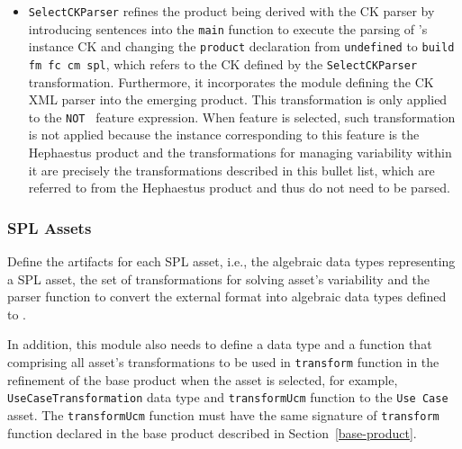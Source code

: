 \begin{itemize}
\item \texttt{SelectCKParser} refines the product being derived with the CK parser by introducing sentences into the \texttt{main} function to execute the parsing of \hpl's instance CK and changing the \texttt{product} declaration from \texttt{undefined} to \texttt{build fm fc cm spl}, which refers to the CK defined by the \texttt{SelectCKParser} transformation. Furthermore, it incorporates the module defining the CK XML parser into the emerging product. This transformation is only applied to the \texttt{NOT \hp{}} feature expression. When \texttt{\hp{}} feature is selected, such transformation is not applied because the instance corresponding to this feature is the Hephaestus product and the transformations for managing variability within it are precisely the transformations described in this bullet list, which are referred to from the Hephaestus product and thus do not need to be parsed.
\end{itemize}


\subsubsection{SPL Assets} \label{spl-assets}

Define the artifacts for each SPL asset, i.e., the algebraic data types representing a SPL asset, the set of transformations for solving asset's variability and the parser function to convert the external format into algebraic data types defined to \hpl.

In addition, this module also needs to define a data type and a function that comprising all asset's transformations to be used in \texttt{transform} function in the refinement of the base product when the asset is selected, for example, \texttt{UseCaseTransformation} data type and \texttt{transformUcm} function to the \texttt{Use Case} asset. The \texttt{transformUcm} function must have the same signature of \texttt{transform} function declared in the base product described in Section~\ref{base-product}.


